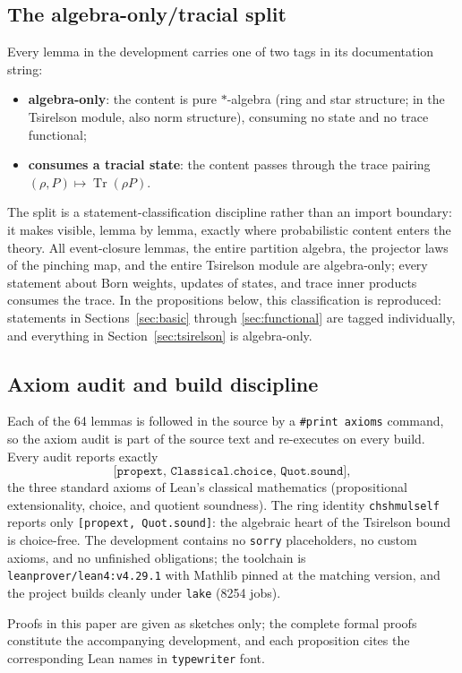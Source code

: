 \documentclass[11pt]{article}
\renewcommand{\_}{\textunderscore\allowbreak}
\theoremstyle{remark}
\newcommand{\Tr}{\operatorname{Tr}}
\begin{document}
\subsection{The algebra-only/tracial split}

Every lemma in the development carries one of two tags in its documentation string:
\begin{itemize}
\item \textbf{algebra-only}: the content is pure $*$-algebra (ring and star structure; in the Tsirelson module, also norm structure), consuming no state and no trace functional;
\item \textbf{consumes a tracial state}: the content passes through the trace pairing $(\rho, P) \mapsto \Tr(\rho P)$.
\end{itemize}
The split is a statement-classification discipline rather than an import boundary: it makes visible, lemma by lemma, exactly where probabilistic content enters the theory. All event-closure lemmas, the entire partition algebra, the projector laws of the pinching map, and the entire Tsirelson module are algebra-only; every statement about Born weights, updates of states, and trace inner products consumes the trace. In the propositions below, this classification is reproduced: statements in Sections~\ref{sec:basic} through \ref{sec:functional} are tagged individually, and everything in Section~\ref{sec:tsirelson} is algebra-only.

\subsection{Axiom audit and build discipline}

Each of the 64 lemmas is followed in the source by a \texttt{\#print axioms} command, so the axiom audit is part of the source text and re-executes on every build. Every audit reports exactly
\[
\texttt{[propext, Classical.choice, Quot.sound]},
\]
the three standard axioms of Lean's classical mathematics (propositional extensionality, choice, and quotient soundness). The ring identity \texttt{chsh\_mul\_self} reports only \texttt{[propext, Quot.sound]}: the algebraic heart of the Tsirelson bound is choice-free. The development contains no \texttt{sorry} placeholders, no custom axioms, and no unfinished obligations; the toolchain is \texttt{leanprover/lean4:v4.29.1} with Mathlib pinned at the matching version, and the project builds cleanly under \texttt{lake} (8254 jobs).

Proofs in this paper are given as sketches only; the complete formal proofs constitute the accompanying development, and each proposition cites the corresponding Lean names in \texttt{typewriter} font.
\end{document}
